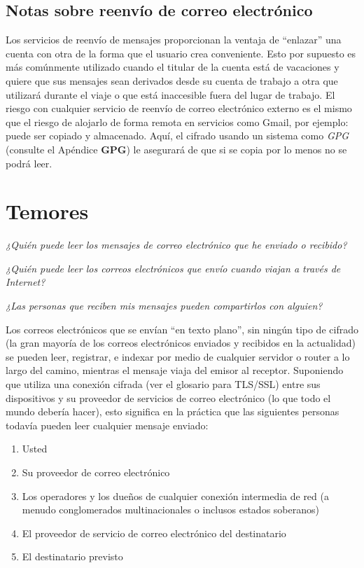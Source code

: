\documentclass[10pt,a5paper,twoside,,]{book}
\providecommand{\tightlist}{%
  \setlength{\itemsep}{0pt}\setlength{\parskip}{0pt}}
\begin{document}
\section{Notas sobre reenvío de correo
electrónico}\label{notas-sobre-reenvuxedo-de-correo-electruxf3nico}

Los servicios de reenvío de mensajes proporcionan la ventaja de
``enlazar'' una cuenta con otra de la forma que el usuario crea
conveniente. Esto por supuesto es más comúnmente utilizado cuando el
titular de la cuenta está de vacaciones y quiere que sus mensajes sean
derivados desde su cuenta de trabajo a otra que utilizará durante el
viaje o que está inaccesible fuera del lugar de trabajo. El riesgo con
cualquier servicio de reenvío de correo electrónico externo es el mismo
que el riesgo de alojarlo de forma remota en servicios como Gmail, por
ejemplo: puede ser copiado y almacenado. Aquí, el cifrado usando un
sistema como \emph{GPG} (consulte el Apéndice \textbf{GPG}) le asegurará
de que si se copia por lo menos no se podrá leer.

\chapter{Temores}\label{temores}

\emph{¿Quién puede leer los mensajes de correo electrónico que he
enviado o recibido?}

\emph{¿Quién puede leer los correos electrónicos que envío cuando viajan
a través de Internet?}

\emph{¿Las personas que reciben mis mensajes pueden compartirlos con
alguien?}

Los correos electrónicos que se envían ``en texto plano'', sin ningún
tipo de cifrado (la gran mayoría de los correos electrónicos enviados y
recibidos en la actualidad) se pueden leer, registrar, e indexar por
medio de cualquier servidor o router a lo largo del camino, mientras el
mensaje viaja del emisor al receptor. Suponiendo que utiliza una
conexión cifrada (ver el glosario para TLS/SSL) entre sus dispositivos y
su proveedor de servicios de correo electrónico (lo que todo el mundo
debería hacer), esto significa en la práctica que las siguientes
personas todavía pueden leer cualquier mensaje enviado:

\begin{enumerate}
\def\labelenumi{\arabic{enumi}.}
\tightlist
\item
  Usted
\item
  Su proveedor de correo electrónico
\item
  Los operadores y los dueños de cualquier conexión intermedia de red (a
  menudo conglomerados multinacionales o inclusos estados soberanos)
\item
  El proveedor de servicio de correo electrónico del destinatario
\item
  El destinatario previsto
\end{enumerate}
\end{document}
